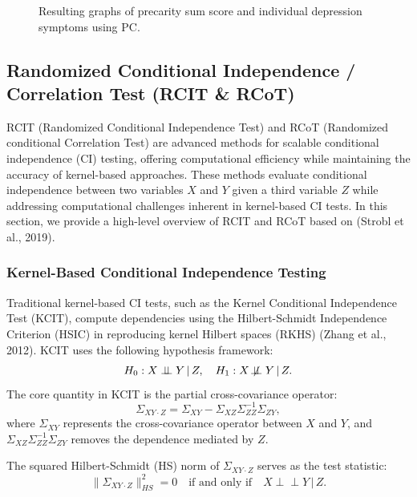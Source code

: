 \documentclass[
]{article}
\begin{document}
\begin{figure}
\begin{minipage}{\linewidth}
{}


\end{minipage}%

\caption{\label{fig-pc_presum}Resulting graphs of precarity sum score
and individual depression symptoms using PC.}

\end{figure}%

\clearpage

\subsection{Randomized Conditional Independence / Correlation Test (RCIT
\& RCoT)}\label{sec-rcot}

RCIT (Randomized Conditional Independence Test) and RCoT (Randomized
conditional Correlation Test) are advanced methods for scalable
conditional independence (CI) testing, offering computational efficiency
while maintaining the accuracy of kernel-based approaches. These methods
evaluate conditional independence between two variables \(X\) and \(Y\)
given a third variable \(Z\) while addressing computational challenges
inherent in kernel-based CI tests. In this section, we provide a
high-level overview of RCIT and RCoT based on (Strobl et al., 2019).

\subsubsection{Kernel-Based Conditional Independence
Testing}\label{kernel-based-conditional-independence-testing}

Traditional kernel-based CI tests, such as the Kernel Conditional
Independence Test (KCIT), compute dependencies using the Hilbert-Schmidt
Independence Criterion (HSIC) in reproducing kernel Hilbert spaces
(RKHS) (Zhang et al., 2012). KCIT uses the following hypothesis
framework: \[
H_0: X \perp\!\!\!\perp Y \,|\, Z, \quad H_1: X \not\!\perp\!\!\!\perp Y \,|\, Z.
\] The core quantity in KCIT is the partial cross-covariance operator:
\[
\Sigma_{XY \cdot Z} = \Sigma_{XY} - \Sigma_{XZ} \Sigma_{ZZ}^{-1} \Sigma_{ZY},
\] where \(\Sigma_{XY}\) represents the cross-covariance operator
between \(X\) and \(Y\), and
\(\Sigma_{XZ} \Sigma_{ZZ}^{-1} \Sigma_{ZY}\) removes the dependence
mediated by \(Z\).

The squared Hilbert-Schmidt (HS) norm of \(\Sigma_{XY \cdot Z}\) serves
as the test statistic: \[
\|\Sigma_{XY \cdot Z}\|^2_{HS} = 0 \quad \text{if and only if} \quad X \perp\!\!\!\perp Y \,|\, Z.
\]
\end{document}
